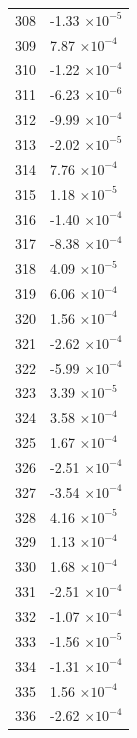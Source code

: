 \documentclass[a4paper,11pt]{article}
\begin{document}
\begin{center}
\begin{longtable}{|R{1.5cm}|R{2.5cm}|}
  308 &        -1.33 $\times 10^{          -5}$ \\
  309 &         7.87 $\times 10^{          -4}$ \\
  310 &        -1.22 $\times 10^{          -4}$ \\
  311 &        -6.23 $\times 10^{          -6}$ \\
  312 &        -9.99 $\times 10^{          -4}$ \\
  313 &        -2.02 $\times 10^{          -5}$ \\
  314 &         7.76 $\times 10^{          -4}$ \\
  315 &         1.18 $\times 10^{          -5}$ \\
  316 &        -1.40 $\times 10^{          -4}$ \\
  317 &        -8.38 $\times 10^{          -4}$ \\
  318 &         4.09 $\times 10^{          -5}$ \\
  319 &         6.06 $\times 10^{          -4}$ \\
  320 &         1.56 $\times 10^{          -4}$ \\
  321 &        -2.62 $\times 10^{          -4}$ \\
  322 &        -5.99 $\times 10^{          -4}$ \\
  323 &         3.39 $\times 10^{          -5}$ \\
  324 &         3.58 $\times 10^{          -4}$ \\
  325 &         1.67 $\times 10^{          -4}$ \\
  326 &        -2.51 $\times 10^{          -4}$ \\
  327 &        -3.54 $\times 10^{          -4}$ \\
  328 &         4.16 $\times 10^{          -5}$ \\
  329 &         1.13 $\times 10^{          -4}$ \\
  330 &         1.68 $\times 10^{          -4}$ \\
  331 &        -2.51 $\times 10^{          -4}$ \\
  332 &        -1.07 $\times 10^{          -4}$ \\
  333 &        -1.56 $\times 10^{          -5}$ \\
  334 &        -1.31 $\times 10^{          -4}$ \\
  335 &         1.56 $\times 10^{          -4}$ \\
  336 &        -2.62 $\times 10^{          -4}$ \\

\end{longtable}
\end{center}
\end{document}

